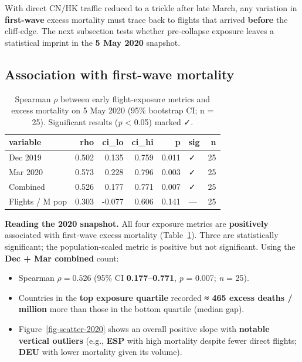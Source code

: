 \documentclass[
  authoryear,
  preprint,
  3p,
  onecolumn]{elsarticle}
\providecommand{\tightlist}{%
  \setlength{\itemsep}{0pt}\setlength{\parskip}{0pt}}\usepackage{longtable,booktabs,array}
\begin{document}
With direct CN/HK traffic reduced to a trickle after late March, any
variation in \textbf{first-wave} excess mortality must trace back to
flights that arrived \textbf{before} the cliff-edge. The next subsection
tests whether pre-collapse exposure leaves a statistical imprint in the
\textbf{5 May 2020} snapshot.

\subsection{Association with first-wave mortality}\label{baseline-2020}

\begin{longtable}[]{@{}lrrrrlr@{}}

\caption{\label{tbl-spearman_2020}Spearman \(\rho\) between early
flight-exposure metrics and excess mortality on 5 May 2020 (95\%
bootstrap CI; n = 25). Significant results (\emph{p} \textless{} 0.05)
marked ✓.}

\tabularnewline

\toprule\noalign{}
variable & rho & ci\_lo & ci\_hi & p & sig & n \\
\midrule\noalign{}
\endhead
\bottomrule\noalign{}
\endlastfoot
Dec 2019 & 0.502 & 0.135 & 0.759 & 0.011 & ✓ & 25 \\
Mar 2020 & 0.573 & 0.228 & 0.796 & 0.003 & ✓ & 25 \\
Combined & 0.526 & 0.177 & 0.771 & 0.007 & ✓ & 25 \\
Flights / M pop & 0.303 & -0.077 & 0.606 & 0.141 & --- & 25 \\

\end{longtable}

\textbf{Reading the 2020 snapshot.} All four exposure metrics are
\textbf{positively} associated with first-wave excess mortality
(Table~\ref{tbl-spearman_2020}). Three are statistically significant;
the population-scaled metric is positive but not significant. Using the
\textbf{Dec + Mar combined} count:

\begin{itemize}
\tightlist
\item
  Spearman \(\rho = 0.526\) (95\% CI \textbf{0.177--0.771}, \emph{p} =
  0.007; \emph{n} = 25).
\item
  Countries in the \textbf{top exposure quartile} recorded \textbf{≈ 465
  excess deaths / million} more than those in the bottom quartile
  (median gap).
\item
  Figure~\ref{fig-scatter-2020} shows an overall positive slope with
  \textbf{notable vertical outliers} (e.g., \textbf{ESP} with high
  mortality despite fewer direct flights; \textbf{DEU} with lower
  mortality given its volume).
\end{itemize}
\end{document}

